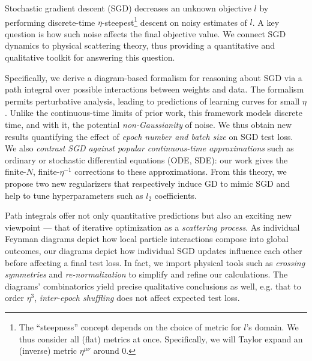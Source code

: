 \documentclass{article}
\begin{document}

        Stochastic gradient descent (SGD) decreases an unknown objective $l$ by
        performing discrete-time $\eta$-steepest\footnote{
            The ``steepness'' concept depends on the choice of metric for
            $l$'s domain.  We thus consider all (flat) metrics at once.
            Specifically, we will Taylor expand an (inverse) metric
            $\eta^{\mu\nu}$ around $0$.
        } descent on noisy estimates of $l$.  A key question is how such noise
        affects the final objective value.  We connect SGD dynamics to physical
        scattering theory, thus providing a quantitative and qualitative
        toolkit for answering this question.


        Specifically, we derive a diagram-based formalism for reasoning about
        SGD via a path integral over possible interactions between weights and
        data.  The formalism permits perturbative analysis, leading to
        predictions of learning curves for small $\eta$.  Unlike the
        continuous-time limits of prior work, this framework models discrete
        time, and with it, the potential \emph{non-Gaussianity} of noise.  We
        thus obtain new results quantifying the effect of \emph{epoch number
        and batch size} on SGD test loss.  We also \emph{contrast SGD against
        popular continuous-time approximations} such as ordinary or stochastic
        differential equations (ODE, SDE): our work gives the finite-$N$,
        finite-$\eta^{-1}$ corrections to these approximations.  From this
        theory, we propose two new regularizers that respectively induce GD to
        mimic SGD and help to tune hyperparameters such as $l_2$ coefficients.
        

        Path integrals offer not only quantitative predictions but also an
        exciting new viewpoint --- that of iterative optimization as a
        \emph{scattering process}.  As individual Feynman diagrams 
        \citep{dy49a} depict how local particle interactions compose into
        global outcomes, our diagrams depict how individual SGD updates
        influence each other before affecting a final test loss.  In fact, we
        import physical tools such as \emph{crossing symmetries} 
        \citep{dy49b} and \emph{re-normalization} \citep{ge54} to
        simplify and refine our calculations.  The diagrams' combinatorics
        yield precise qualitative conclusions as well, e.g. that to
        order $\eta^3$, \emph{inter-epoch shuffling} does not affect expected
        test loss.
\end{document}
